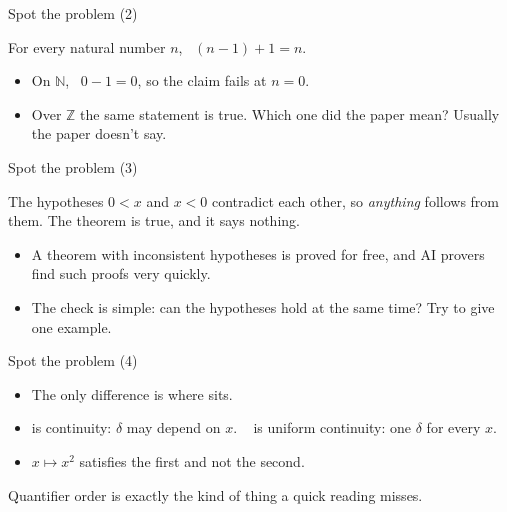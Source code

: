 \documentclass[10pt, aspectratio=169]{beamer}
\begin{document}
\begin{frame}[fragile,t]{Spot the problem (2)}
\begin{paper}[Claim]
For every natural number $n$, \ $(n - 1) + 1 = n$.
\end{paper}

\pause
{}

\begin{itemize}
\item On $\mathbb{N}$, \ $0 - 1 = 0$, so the claim fails at $n = 0$.
\item Over $\mathbb{Z}$ the same statement is true. Which one did the paper mean? Usually the paper doesn't say.
\end{itemize}
\end{frame}

\begin{frame}[fragile,t]{Spot the problem (3)}

\pause
\begin{caveat}
The hypotheses $0 < x$ and $x < 0$ contradict each other, so \emph{anything} follows from them. The theorem is true, and it says nothing.
\end{caveat}

\begin{itemize}
\item A theorem with inconsistent hypotheses is proved for free, and AI provers find such proofs very quickly.
\item The check is simple: can the hypotheses hold at the same time? Try to give one example.
\end{itemize}
\end{frame}

\begin{frame}[fragile,t]{Spot the problem (4)}

\pause
\begin{itemize}
\item The only difference is where  sits.
\item {} is continuity: $\delta$ may depend on $x$. \  is uniform continuity: one $\delta$ for every $x$.
\item $x \mapsto x^2$ satisfies the first and not the second.
\end{itemize}

\begin{keypoint}
\normalsize Quantifier order is exactly the kind of thing a quick reading misses.
\end{keypoint}
\end{frame}
\end{document}
